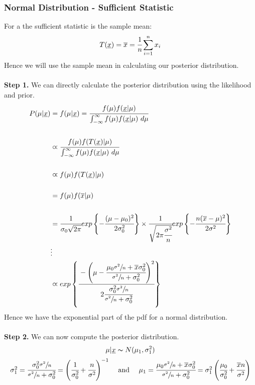 \documentclass{report}
\begin{document}
\subsubsection*{Normal Distribution - Sufficient Statistic}

For a  the sufficient statistic is the sample mean:
\[T(\underline{x}) = \overline{x} = \cfrac{1}{n}\sum_{i=1}^n x_i\]
Hence we will use the sample mean in calculating our posterior distribution.
\\
\\ \textbf{Step 1.} We can directly calculate the posterior distribution using the likelihood and prior.
\[\begin{split}
		P(\mu|\underline{x}) &= f(\mu|\underline{x}) = \cfrac{f(\mu)f(\underline{x}|\mu)}{\int_{-\infty}^\infty f(\mu)f(\underline{x}|\mu) \ d \mu} \\
		\\
		&\varpropto  \cfrac{f(\mu)f(T(\underline{x})|\mu)}{\int_{-\infty}^\infty f(\mu)f(\underline{x}|\mu) \ d \mu} \\
		\\
		&\varpropto f(\mu)f(T(\underline{x})| \mu) \\
		\\
		&= f(\mu)f(\overline{x}| \mu) \\
		\\
		&= \cfrac{1}{\sigma_0 \sqrt{2 \pi}} exp \left\{ -\cfrac{(\mu - \mu_0)^2}{2 \sigma^2_0} \right\} \times \cfrac{1}{\sqrt{2 \pi \cfrac{\sigma^2}{n}}} exp \left\{ -\cfrac{n(\overline{x} - \mu)^2}{2 \sigma^2} \right\} \\
		& \vdots \\
		&\varpropto exp \left\{ \cfrac{-\left( \mu - \cfrac{\mu_0\sfrac{\sigma^2}{n} + \overline{x}\sigma^2_0}{\sfrac{\sigma^2}{n} + \sigma^2_0} \right)^2}{2 \cfrac{\sigma^2_0\sfrac{\sigma^2}{n}}{\sfrac{\sigma^2}{n} + \sigma_0^2}} \right\}
	\end{split}\]
Hence we have the exponential part of the pdf for a normal distribution.
\\
\\ \textbf{Step 2.} We can now compute the posterior distribution.
\[\mu|\underline{x} \thicksim N(\mu_1, \sigma_1^2)\]
\[\begin{matrix}
		\sigma_1^2 = \cfrac{\sigma_0^2\sfrac{\sigma^2}{n}}{\sfrac{\sigma^2}{n} + \sigma_0^2} = \left( \cfrac{1}{\sigma^2_0} + \cfrac{n}{\sigma^2} \right)^{-1} & \text{  and  } & \mu_1 = \cfrac{\mu_0 \sfrac{\sigma^2}{n} + \overline{x}\sigma_0^2}{\sfrac{\sigma^2}{n} + \sigma^2_0} = \sigma_1^2 \left( \cfrac{\mu_0}{\sigma_0^2} + \cfrac{\overline{x}n}{\sigma^2} \right)
	\end{matrix}\]
\end{document}
